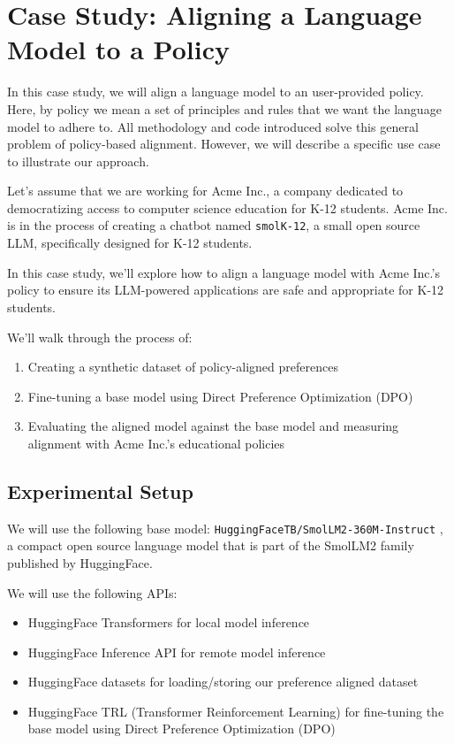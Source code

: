 \section{Case Study: Aligning a Language Model to a Policy}
\label{section:alignment-case-study}

In this case study, we will align a language model to an user-provided policy. Here, by policy we mean a set of principles and rules that we want the language model to adhere to. All methodology and code introduced solve this general problem of policy-based alignment. However, we will describe a specific use case to illustrate our approach.

Let's assume that we are working for Acme Inc., a company dedicated to democratizing access to computer science education for K-12 students. Acme Inc. is in the process of creating a chatbot named \texttt{smolK-12}, a small open source LLM, specifically designed for K-12 students.

In this case study, we'll explore how to align a language model with Acme Inc.'s policy to ensure its LLM-powered applications are safe and appropriate for K-12 students.

We'll walk through the process of:
\begin{enumerate}
\item Creating a synthetic dataset of policy-aligned preferences
\item Fine-tuning a base model using Direct Preference Optimization (DPO)
\item Evaluating the aligned model against the base model and measuring alignment with Acme Inc.'s educational policies
\end{enumerate}

\subsection{Experimental Setup}

We will use the following base model: \texttt{HuggingFaceTB/SmolLM2-360M-Instruct} , a compact open source language model that is part of the SmolLM2 family published by HuggingFace.

We will use the following APIs:

\begin{itemize}
\item HuggingFace Transformers for local model inference
\item HuggingFace Inference API for remote model inference
\item HuggingFace datasets for loading/storing our preference aligned dataset
\item HuggingFace TRL (Transformer Reinforcement Learning) for fine-tuning the base model using Direct Preference Optimization (DPO)
\end{itemize}

